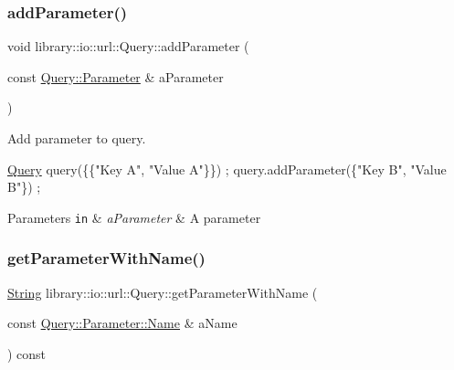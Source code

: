 \subsubsection{\texorpdfstring{add\+Parameter()}{addParameter()}}
{\footnotesize\ttfamily void library\+::io\+::url\+::\+Query\+::add\+Parameter (\begin{DoxyParamCaption}\item[{const \hyperlink{classlibrary_1_1io_1_1url_1_1_query_1_1_parameter}{Query\+::\+Parameter} \&}]{a\+Parameter }\end{DoxyParamCaption})}



Add parameter to query. 


\begin{DoxyCode}
\hyperlink{classlibrary_1_1io_1_1url_1_1_query_a6781de8f7b7251f8e17c191434b08039}{Query} query(\{\{\textcolor{stringliteral}{"Key A"}, \textcolor{stringliteral}{"Value A"}\}\}) ;
query.addParameter(\{\textcolor{stringliteral}{"Key B"}, \textcolor{stringliteral}{"Value B"}\}) ;
\end{DoxyCode}



\begin{DoxyParams}[1]{Parameters}
\mbox{\tt in}  & {\em a\+Parameter} & A parameter \\
\hline
\end{DoxyParams}
\mbox{\label{classlibrary_1_1io_1_1url_1_1_query_a5d279ba3f21372fb4768d32a74492b85}} 
\subsubsection{\texorpdfstring{get\+Parameter\+With\+Name()}{getParameterWithName()}}
{\footnotesize\ttfamily \hyperlink{namespacelibrary_1_1io_a7469b45835a4421045db344d6a5a1f85}{String} library\+::io\+::url\+::\+Query\+::get\+Parameter\+With\+Name (\begin{DoxyParamCaption}\item[{const \hyperlink{classlibrary_1_1io_1_1url_1_1_query_1_1_parameter_a7edf5fb8a4ae57aed1ce5dfa2405c981}{Query\+::\+Parameter\+::\+Name} \&}]{a\+Name }\end{DoxyParamCaption}) const}



